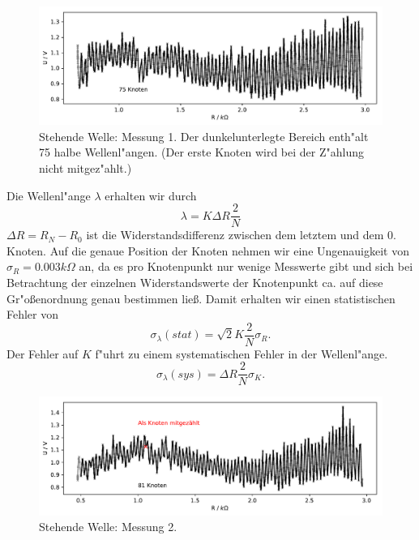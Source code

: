 \documentclass[12pt,a4paper]{article}
\begin{document}
\begin{figure}[H]
	\centering
	\includegraphics[scale=0.8]{Python/stehwel1.pdf}
	\caption{Stehende Welle: Messung 1. Der dunkelunterlegte Bereich enth"alt 75 halbe Wellenl"angen. (Der erste Knoten wird bei der Z"ahlung nicht mitgez"ahlt.)}
\end{figure}

Die Wellenl"ange $\lambda$ erhalten wir durch
\begin{equation}
\lambda=K\Delta R\frac{2}{N}
\end{equation}
$\Delta R=R_N-R_0$ ist die Widerstandsdifferenz zwischen dem letztem und dem 0. Knoten. Auf die genaue Position der Knoten nehmen wir eine Ungenauigkeit von $\sigma_R=0.003k\Omega$ an, da es pro Knotenpunkt nur wenige Messwerte gibt und sich bei Betrachtung der einzelnen Widerstandswerte der Knotenpunkt ca. auf diese Gr"o\ss enordnung genau bestimmen lie\ss. Damit erhalten wir einen statistischen Fehler von
\begin{equation}
\sigma_{\lambda}(stat)=\sqrt{2}K\frac{2}{N}\sigma_{R}.
\end{equation}
Der Fehler auf $K$ f"uhrt zu einem systematischen Fehler in der Wellenl"ange.
\begin{equation}
\sigma_{\lambda}(sys)=\Delta R\frac{2}{N}\sigma_{K}.
\end{equation}

\begin{figure}[H]
	\centering
	\includegraphics[scale=0.8]{Python/stehwel2.pdf}
	\caption{Stehende Welle: Messung 2.}
\end{figure}
\end{document}
